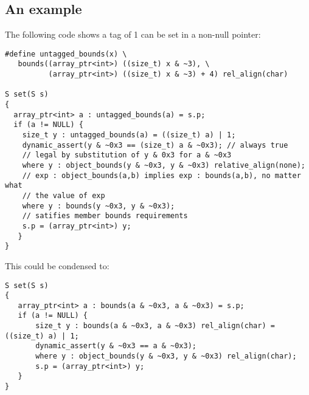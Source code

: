 \subsection{An example}

The following code shows a tag of 1 can be set in a non-null pointer:

\begin{verbatim}
#define untagged_bounds(x) \
   bounds((array_ptr<int>) ((size_t) x & ~3), \
          (array_ptr<int>) ((size_t) x & ~3) + 4) rel_align(char)

S set(S s) 
{
  array_ptr<int> a : untagged_bounds(a) = s.p;
  if (a != NULL) {
    size_t y : untagged_bounds(a) = ((size_t) a) | 1;
    dynamic_assert(y & ~0x3 == (size_t) a & ~0x3); // always true
    // legal by substitution of y & 0x3 for a & ~0x3
    where y : object_bounds(y & ~0x3, y & ~0x3) relative_align(none);
    // exp : object_bounds(a,b) implies exp : bounds(a,b), no matter what
    // the value of exp
    where y : bounds(y ~0x3, y & ~0x3);
    // satifies member bounds requirements
    s.p = (array_ptr<int>) y;
   }
}
\end{verbatim}

This could be condensed to:
\begin{verbatim}
S set(S s) 
{
   array_ptr<int> a : bounds(a & ~0x3, a & ~0x3) = s.p;
   if (a != NULL) {
       size_t y : bounds(a & ~0x3, a & ~0x3) rel_align(char) = ((size_t) a) | 1;
       dynamic_assert(y & ~0x3 == a & ~0x3);
       where y : object_bounds(y & ~0x3, y & ~0x3) rel_align(char);
       s.p = (array_ptr<int>) y;
   }
} 
\end{verbatim}